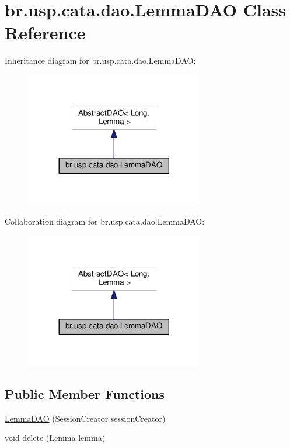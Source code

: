 \hypertarget{classbr_1_1usp_1_1cata_1_1dao_1_1_lemma_d_a_o}{\section{br.\+usp.\+cata.\+dao.\+Lemma\+D\+A\+O Class Reference}
\label{classbr_1_1usp_1_1cata_1_1dao_1_1_lemma_d_a_o}
}


Inheritance diagram for br.\+usp.\+cata.\+dao.\+Lemma\+D\+A\+O\+:\nopagebreak
\begin{figure}[H]
\begin{center}
\leavevmode
\includegraphics[width=221pt]{classbr_1_1usp_1_1cata_1_1dao_1_1_lemma_d_a_o__inherit__graph}
\end{center}
\end{figure}


Collaboration diagram for br.\+usp.\+cata.\+dao.\+Lemma\+D\+A\+O\+:\nopagebreak
\begin{figure}[H]
\begin{center}
\leavevmode
\includegraphics[width=221pt]{classbr_1_1usp_1_1cata_1_1dao_1_1_lemma_d_a_o__coll__graph}
\end{center}
\end{figure}
\subsection*{Public Member Functions}
\begin{DoxyCompactItemize}
\item 
\hyperlink{classbr_1_1usp_1_1cata_1_1dao_1_1_lemma_d_a_o_a9426ae065e0e7e190e7939ecac2c8873}{Lemma\+D\+A\+O} (Session\+Creator session\+Creator)
\item 
void \hyperlink{classbr_1_1usp_1_1cata_1_1dao_1_1_lemma_d_a_o_a5ef6306bc7fd96568afb848111530f62}{delete} (\hyperlink{classbr_1_1usp_1_1cata_1_1model_1_1_lemma}{Lemma} lemma)
\end{DoxyCompactItemize}


